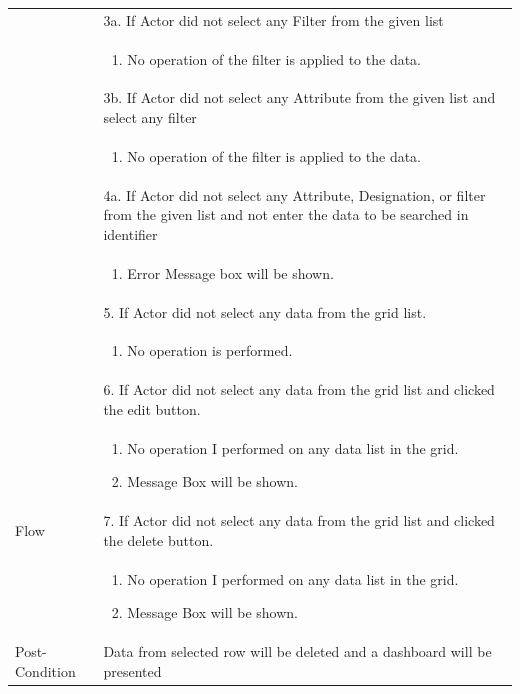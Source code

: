 \documentclass[12pt,a4paper]{report}
\begin{document}
\begin{tabular}{ | m{3cm} | m{12cm}| } \hline

& 3a. If Actor did not select any Filter from the given list \\
& \begin{enumerate}
		\item No operation of the filter is applied to the data.
	\end{enumerate}
\\ 
& 3b. If Actor did not select any Attribute from the given list and select any filter  \\
& \begin{enumerate}
		\item No operation of the filter is applied to the data.
	\end{enumerate}
\\ 

& 4a. If Actor did not select any Attribute, Designation, or filter from the given list and not enter the data to be searched in identifier \\
& \begin{enumerate}
		\item Error Message box will be shown.
	\end{enumerate}
\\  
& 5. If Actor did not select any data from the grid list.  \\
& \begin{enumerate}
		\item No operation is performed.
	\end{enumerate}
\\ 
& 6. If Actor did not select any data from the grid list and clicked the edit button.\\
& \begin{enumerate}
		\item No operation I performed on any data list in the grid.
            \item Message Box will be shown.
	\end{enumerate}
\\
Flow       & 7. If Actor did not select any data from the grid list and clicked the delete button.\\
 	&\begin{enumerate}
			\item No operation I performed on any data list in the grid.
            \item Message Box will be shown.
	\end{enumerate}
\\ \hline 


Post-Condition &  Data from selected row will be deleted and a dashboard will be presented  \\ \hline

\end{tabular}
\end{document}
